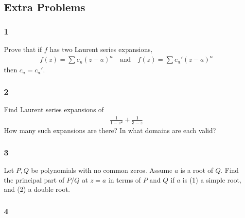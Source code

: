 \hypertarget{extra-problems}{%
\subsection{Extra Problems}\label{extra-problems}}

\hypertarget{section-73}{%
\subsubsection{1}\label{section-73}}

\begin{description}
\tightlist
\item[Problem]
Prove that if \(f\) has two Laurent series expansions,
\begin{align*}
  f(z) = \sum c_n(z-a)^n \quad\text{and}\quad f(z) = \sum c_n'(z-a)^n
  \end{align*}
then \(c_n = c_n'\).
\end{description}

\hypertarget{section-74}{%
\subsubsection{2}\label{section-74}}

\begin{description}
\tightlist
\item[Problem]
Find Laurent series expansions of
\begin{align*}
  \frac{1}{1-z^2} + \frac{1}{3-z}
  \end{align*}
How many such expansions are there? In what domains are each valid?
\end{description}

\hypertarget{section-75}{%
\subsubsection{3}\label{section-75}}

\begin{description}
\tightlist
\item[Problem]
Let \(P, Q\) be polynomials with no common zeros. Assume \(a\) is a root
of \(Q\). Find the principal part of \(P/Q\) at \(z=a\) in terms of
\(P\) and \(Q\) if \(a\) is (1) a simple root, and (2) a double root.
\end{description}

\hypertarget{section-76}{%
\subsubsection{4}\label{section-76}}

